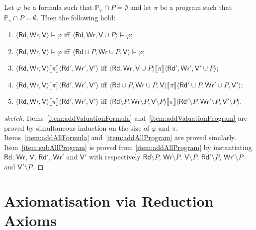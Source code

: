 \documentclass{llncs}
\newcommand{\readset}{\mathsf{Rd}}
\newcommand{\valuset}{\mathsf{V}}
\newcommand{\writeset}{\mathsf{Wr}}
\newcommand{\intPgm}[1]{\llbracket #1 \rrbracket}
\renewcommand{\phi}{\varphi}
\newcommand{\propset}{\mathbb P}
\newcommand{\propsetOf}[1]{\propset_{#1}}
\newcommand{\tuple}[1]{ \langle #1 \rangle}
\begin{document}
\begin{lemma}\label{theo:irrelevantVariables}
Let $\phi$ be a formula such that $\propsetOf \phi \cap P = \emptyset$ and
let $ \pi$ be a program such that $\propsetOf \pi \cap P = \emptyset$. Then the following hold:
\begin{enumerate}
\item\label{item:addValuationFormula}
$\tuple{\readset,\writeset,\valuset} \models \phi $ iff
$\tuple{\readset,\writeset,\valuset\cup P} \models \phi$;
\item\label{item:addAllFormula}
$\tuple{\readset,\writeset,\valuset} \models \phi $ iff
$\tuple{\readset\cup P,\writeset\cup P,\valuset} \models \phi$;
\item\label{item:addValuationProgram}
$\tuple{\readset,\writeset,\valuset} \intPgm \pi \tuple{\readset',\writeset',\valuset'} $ iff
$\tuple{\readset,\writeset,\valuset\cup P} \intPgm \pi \tuple{\readset',\writeset',\valuset'\cup P} $;
\item\label{item:addAllProgram}
$\tuple{\readset,\writeset,\valuset} \intPgm \pi \tuple{\readset',\writeset',\valuset'} $ iff
$\tuple{\readset\cup P,\writeset\cup P,\valuset} \intPgm \pi \tuple{\readset'\cup P,\writeset'\cup P,\valuset'} $;
\item\label{item:subAllProgram}
$\tuple{\readset,\writeset,\valuset} \intPgm \pi \tuple{\readset',\writeset',\valuset'} $ iff
$\tuple{\readset\setminus P,\writeset\setminus P,\valuset\setminus P} \intPgm \pi \tuple{\readset'\setminus P,\writeset'\setminus P,\valuset'\setminus P} $.
\end{enumerate}
\end{lemma}
\begin{proof}[sketch]
Items~\ref{item:addValuationFormula} and~\ref{item:addValuationProgram} are proved by simultaneous
induction on the size of $\phi$ and $\pi$.
Items~\ref{item:addAllFormula} and~\ref{item:addAllProgram} are proved similarly.
Item~\ref{item:subAllProgram} is proved from \ref{item:addAllProgram} by instantiating $\readset$,
$\writeset$, $\valuset$, $\readset'$, $\writeset'$ and $\valuset'$ with respectively
$\readset\setminus P$, $\writeset\setminus P$, $\valuset\setminus P$, $\readset'\setminus P$,
$\writeset'\setminus P$ and $\valuset'\setminus P$.
\end{proof}



\section{Axiomatisation via Reduction Axioms}\label{sec:axiomatisation}
\end{document}

